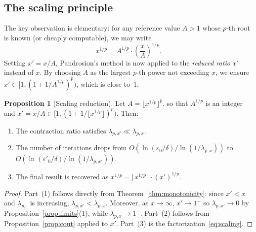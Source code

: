 \documentclass[11pt,a4paper]{article}
\theoremstyle{definition}
\newtheorem{proposition}{Proposition}[section]
\newcommand{\eps}{\varepsilon}
\begin{document}
\subsection{The scaling principle}

The key observation is elementary: for any reference value $A > 1$ whose $p$-th root is known (or cheaply computable), we may write
\begin{equation}
  \label{eq:scaling}
  x^{1/p} = A^{1/p} \cdot \left(\frac{x}{A}\right)^{\!1/p}.
\end{equation}
Setting $x' = x/A$, Pandrosion's method is now applied to the \emph{reduced ratio} $x'$ instead of $x$. By choosing $A$ as the largest $p$-th power not exceeding $x$, we ensure $x' \in [1, (1+1/A^{1/p})^p)$, which is close to~$1$.

\begin{proposition}[Scaling reduction]
\label{prop:scaling}
Let $A = \lfloor x^{1/p} \rfloor^p$, so that $A^{1/p}$ is an integer and $x' = x/A \in [1, (1+1/\lfloor x^{1/p}\rfloor)^p)$. Then:
\begin{enumerate}
  \item The contraction ratio satisfies $\lambda_{p,x'} \ll \lambda_{p,x}$.
  \item The number of iterations drops from $O(\ln(\eps_0/\delta) / \ln(1/\lambda_{p,x}))$ to $O(\ln(\eps'_0/\delta) / \ln(1/\lambda_{p,x'}))$.
  \item The final result is recovered as $x^{1/p} = \lfloor x^{1/p} \rfloor \cdot (x')^{1/p}$.
\end{enumerate}
\end{proposition}

\begin{proof}
Part~(1) follows directly from Theorem~\ref{thm:monotonicity}: since $x' < x$ and $\lambda_{p,\cdot}$ is increasing, $\lambda_{p,x'} < \lambda_{p,x}$. Moreover, as $x \to \infty$, $x' \to 1^+$ so $\lambda_{p,x'} \to 0$ by Proposition~\ref{prop:limits}(1), while $\lambda_{p,x} \to 1^-$. Part~(2) follows from Proposition~\ref{prop:cout} applied to $x'$. Part~(3) is the factorization~\eqref{eq:scaling}.
\end{proof}
\end{document}
